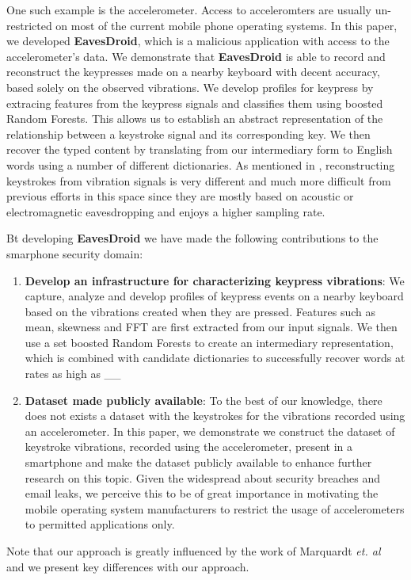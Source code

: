 \documentclass[11pt,conference]{IEEEtran}
\begin{document}
One such example is the accelerometer. Access to acceleromters are usually un-restricted on most of the current mobile phone operating systems. In this paper, we developed \textbf{EavesDroid}, which is a malicious application with access to the accelerometer's data. We demonstrate that \textbf{EavesDroid} is able to record and reconstruct the keypresses made on a nearby keyboard with decent accuracy, based solely on the observed vibrations. We develop profiles for keypress by extracing features from the keypress signals and classifies them using boosted Random Forests. This allows us to establish an abstract representation of the relationship between a keystroke signal and its corresponding key. We then recover the typed content
by translating from our intermediary form to English words using a number
of different dictionaries. As mentioned in \cite{spiphone}, reconstructing keystrokes from vibration signals is very different and much more difficult from previous efforts in this space since they are mostly based on acoustic or electromagnetic eavesdropping and enjoys a higher sampling rate. 

Bt developing \textbf{EavesDroid} we have made the following contributions to the smarphone security domain:
\begin{enumerate}
\item {\bf Develop an infrastructure for characterizing keypress vibrations}: We
capture, analyze and develop profiles of keypress events on a nearby
keyboard based on the vibrations created when they are pressed. Features such as mean, skewness and FFT are first extracted from our input signals. We then use a set boosted Random Forests to create an intermediary
representation, which is combined with candidate dictionaries
to successfully recover words at rates as high as \_\_ %
\item {\bf Dataset made publicly available}: To the best of our knowledge,
there does not exists a dataset with
the keystrokes for the vibrations recorded using an accelerometer. In this
paper, we demonstrate we construct the dataset of keystroke vibrations,
recorded using the accelerometer, present in a smartphone and make
the dataset publicly available to enhance further research on this topic. Given
the widespread about security breaches and email leaks, we perceive this to be
of great importance in motivating the mobile operating system manufacturers
to restrict the usage of accelerometers to permitted applications only.\\
\end{enumerate}
\noindent Note that our approach is greatly influenced by the work of
Marquardt \emph{et. al}~\cite{spiphone} and we present key differences with our
approach.
\end{document}
